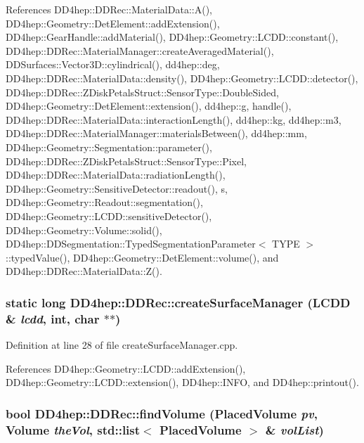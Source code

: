 References DD4hep::DDRec::MaterialData::A(), DD4hep::Geometry::DetElement::addExtension(), DD4hep::GearHandle::addMaterial(), DD4hep::Geometry::LCDD::constant(), DD4hep::DDRec::MaterialManager::createAveragedMaterial(), DDSurfaces::Vector3D::cylindrical(), dd4hep::deg, DD4hep::DDRec::MaterialData::density(), DD4hep::Geometry::LCDD::detector(), DD4hep::DDRec::ZDiskPetalsStruct::SensorType::DoubleSided, DD4hep::Geometry::DetElement::extension(), dd4hep::g, handle(), DD4hep::DDRec::MaterialData::interactionLength(), dd4hep::kg, dd4hep::m3, DD4hep::DDRec::MaterialManager::materialsBetween(), dd4hep::mm, DD4hep::Geometry::Segmentation::parameter(), DD4hep::DDRec::ZDiskPetalsStruct::SensorType::Pixel, DD4hep::DDRec::MaterialData::radiationLength(), DD4hep::Geometry::SensitiveDetector::readout(), s, DD4hep::Geometry::Readout::segmentation(), DD4hep::Geometry::LCDD::sensitiveDetector(), DD4hep::Geometry::Volume::solid(), DD4hep::DDSegmentation::TypedSegmentationParameter$<$ TYPE $>$::typedValue(), DD4hep::Geometry::DetElement::volume(), and DD4hep::DDRec::MaterialData::Z().\hypertarget{namespace_d_d4hep_1_1_d_d_rec_ac05724c87af6fb53f1305b968449c19b}{
\subsubsection[{createSurfaceManager}]{\setlength{\rightskip}{0pt plus 5cm}static long DD4hep::DDRec::createSurfaceManager (LCDD \& {\em lcdd}, \/  int, \/  char $\ast$$\ast$)}}
\label{namespace_d_d4hep_1_1_d_d_rec_ac05724c87af6fb53f1305b968449c19b}


Definition at line 28 of file createSurfaceManager.cpp.

References DD4hep::Geometry::LCDD::addExtension(), DD4hep::Geometry::LCDD::extension(), DD4hep::INFO, and DD4hep::printout().\hypertarget{namespace_d_d4hep_1_1_d_d_rec_a7b23370837eb2d8876a1e18bb258fd3f}{
\subsubsection[{findVolume}]{\setlength{\rightskip}{0pt plus 5cm}bool DD4hep::DDRec::findVolume (PlacedVolume {\em pv}, \/  Volume {\em theVol}, \/  std::list$<$ PlacedVolume $>$ \& {\em volList})}}
\label{namespace_d_d4hep_1_1_d_d_rec_a7b23370837eb2d8876a1e18bb258fd3f}


